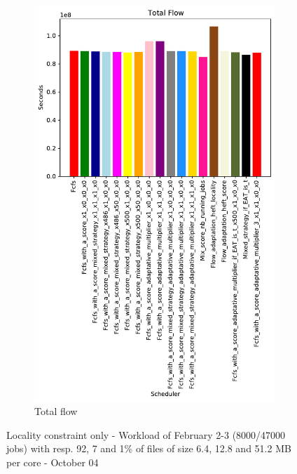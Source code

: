 \documentclass[a4paper]{article}
\begin{document}
\begin{figure}[H]
\begin{subfigure}[b]{0.4\linewidth}\centering\includegraphics[width=0.9\linewidth]{MBSS/plot/Results_FCFS_Score_Adaptative_Multiplier_2022-02-02->2022-02-03_V9271_Total_flow_450_128_32_256_4_1024.pdf}\caption{Total flow}\end{subfigure}
\caption{Locality constraint only - Workload of February 2-3 (8000/47000 jobs) with resp. 92, 7 and 1\% of files of size 6.4, 12.8 and 51.2 MB per core - October 04}\end{figure}
\end{document}

